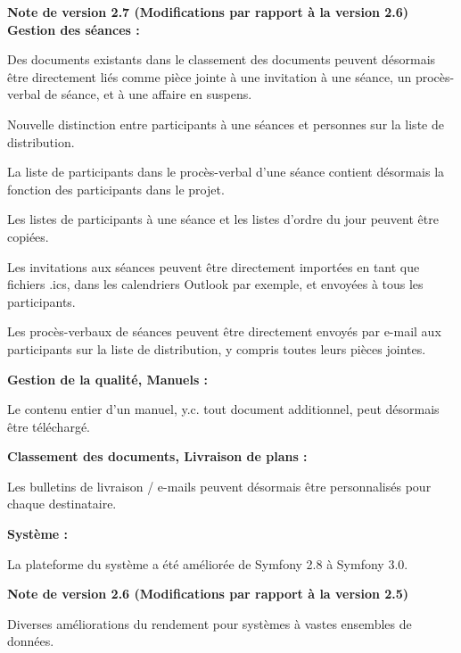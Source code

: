 \textbf{Note de version 2.7 (Modifications par rapport à la version 2.6)} \\
\textbf{Gestion des séances :}
\begin{compactitem}
  \item Des documents existants dans le classement des documents peuvent désormais être directement liés comme pièce jointe à une invitation à une séance, un procès-verbal de séance, et à une affaire en suspens.
	\item Nouvelle distinction entre participants à une séances et personnes sur la liste de distribution.
	\item La liste de participants dans le procès-verbal d'une séance contient désormais la fonction des participants dans le projet.
	\item Les listes de participants à une séance et les listes d'ordre du jour peuvent être copiées.
	\item Les invitations aux séances peuvent être directement importées en tant que fichiers .ics, dans les calendriers Outlook par exemple, et envoyées à tous les participants.
	\item Les procès-verbaux de séances peuvent être directement envoyés par e-mail aux participants sur la liste de distribution, y compris toutes leurs pièces jointes.
\end{compactitem}
\textbf{Gestion de la qualité, Manuels :}
\begin{compactitem}
  \item Le contenu entier d'un manuel, y.c. tout document additionnel, peut désormais être téléchargé.
\end{compactitem}
\textbf{Classement des documents, Livraison de plans :}
\begin{compactitem}
  \item Les bulletins de livraison / e-mails peuvent désormais être personnalisés pour chaque destinataire.
\end{compactitem}
\textbf{Système :}
\begin{compactitem}
  \item La plateforme du système a été améliorée de Symfony 2.8 à Symfony 3.0.
\end{compactitem}
 
\vspace{\baselineskip}
\textbf{Note de version 2.6 (Modifications par rapport à la version 2.5)} \\
\begin{compactitem}
  \item Diverses améliorations du rendement pour systèmes à vastes ensembles de données.
\end{compactitem}

